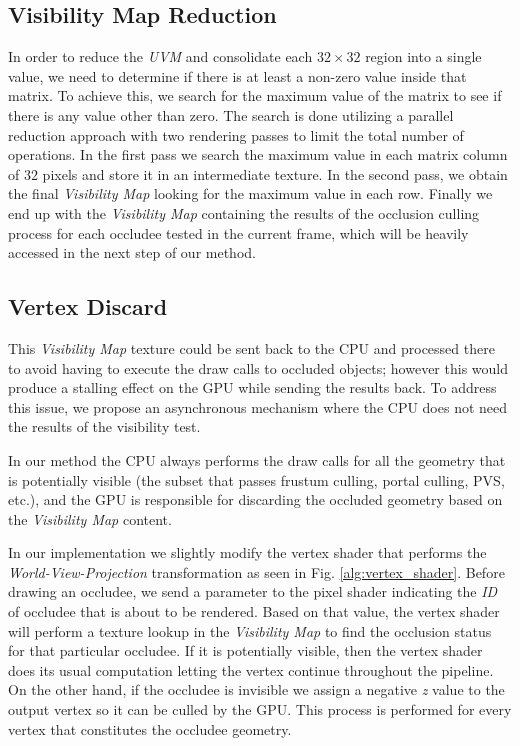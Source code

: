 \documentclass[10pt, conference]{IEEEtran}
\begin{document}
\subsection{Visibility Map Reduction}
%
In order to reduce the \emph{UVM} and consolidate each $32 \times 32$ region into a single value, we need to determine if there is at least a non-zero value inside that matrix. 
To achieve this, we search for the maximum value of the matrix to see if there is any value other than zero. 
The search is done utilizing a parallel reduction approach with two rendering passes to limit the total number of operations. 
In the first pass we search the maximum value in each matrix column of $32$ pixels and store it in an intermediate texture. 
In the second pass, we obtain the final \emph{Visibility Map} looking for the maximum value in each row. 
Finally we end up with the \emph{Visibility Map} containing the results of the occlusion culling process for each occludee tested in the current frame, which will be heavily accessed in the next step of our method. 


\subsection{Vertex Discard}
%
This \emph{Visibility Map} texture could be sent back to the CPU and processed there to avoid having to execute the draw calls to occluded objects; 
however this would produce a stalling effect on the GPU while sending the results back. 
To address this issue, we propose an asynchronous mechanism where the CPU does not need the results of the visibility test.\

In our method the CPU always performs the draw calls for all the geometry that is potentially visible 
(the subset that passes frustum culling, portal culling, PVS, etc.), and the GPU is responsible for discarding the occluded geometry based 
on the \emph{Visibility Map} content.\

In our implementation we slightly modify the vertex shader that performs the \emph{World-View-Projection} transformation as seen in Fig. \ref{alg:vertex_shader}. 
Before drawing an occludee, we send a parameter to the pixel shader indicating the \emph{ID} of occludee that is about to be rendered. 
Based on that value, the vertex shader will perform a texture lookup in the \emph{Visibility Map} to find the occlusion status for that particular occludee. 
If it is potentially visible, then the vertex shader does its usual computation letting the vertex continue throughout the pipeline. 
On the other hand, if the occludee is invisible we assign a negative \emph{z} value to the output vertex so it can be culled by the GPU.
This process is performed for every vertex that constitutes the occludee geometry.
\end{document}
